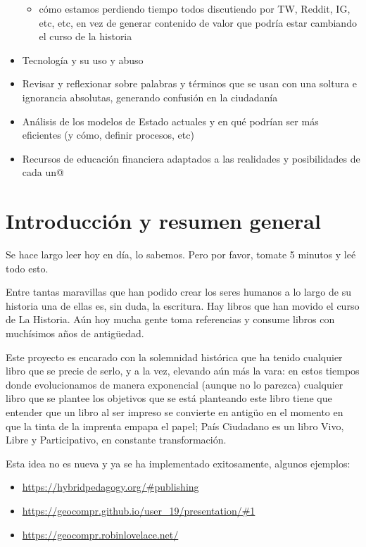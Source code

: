 \documentclass[
]{book}
\providecommand{\tightlist}{%
  \setlength{\itemsep}{0pt}\setlength{\parskip}{0pt}}
\begin{document}
\begin{itemize}
  \begin{itemize}
  \tightlist
  \item
    cómo estamos perdiendo tiempo todos discutiendo por TW, Reddit, IG, etc, etc, en vez de generar contenido de valor que podría estar cambiando el curso de la historia
  \end{itemize}
\item
  Tecnología y su uso y abuso
\item
  Revisar y reflexionar sobre palabras y términos que se usan con una soltura e ignorancia absolutas, generando confusión en la ciudadanía
\item
  Análisis de los modelos de Estado actuales y en qué podrían ser más eficientes (y cómo, definir procesos, etc)
\item
  Recursos de educación financiera adaptados a las realidades y posibilidades de cada un@
\end{itemize}

\hypertarget{intro}{%
\chapter{Introducción y resumen general}\label{intro}}

Se hace largo leer hoy en día, lo sabemos. Pero por favor, tomate 5 minutos y leé todo esto.

Entre tantas maravillas que han podido crear los seres humanos a lo largo de su historia una de ellas es, sin duda, la escritura. Hay libros que han movido el curso de La Historia. Aún hoy mucha gente toma referencias y consume libros con muchísimos años de antigüedad.

Este proyecto es encarado con la solemnidad histórica que ha tenido cualquier libro que se precie de serlo, y a la vez, elevando aún más la vara: en estos tiempos donde evolucionamos de manera exponencial (aunque no lo parezca) cualquier libro que se plantee los objetivos que se está planteando este libro tiene que entender que un libro al ser impreso se convierte en antigüo en el momento en que la tinta de la imprenta empapa el papel; País Ciudadano es un libro Vivo, Libre y Participativo, en constante transformación.

Esta idea no es nueva y ya se ha implementado exitosamente, algunos ejemplos:

\begin{itemize}
\tightlist
\item
  \url{https://hybridpedagogy.org/\#publishing}
\item
  \url{https://geocompr.github.io/user_19/presentation/\#1}
\item
  \url{https://geocompr.robinlovelace.net/}
\end{itemize}
\end{document}
